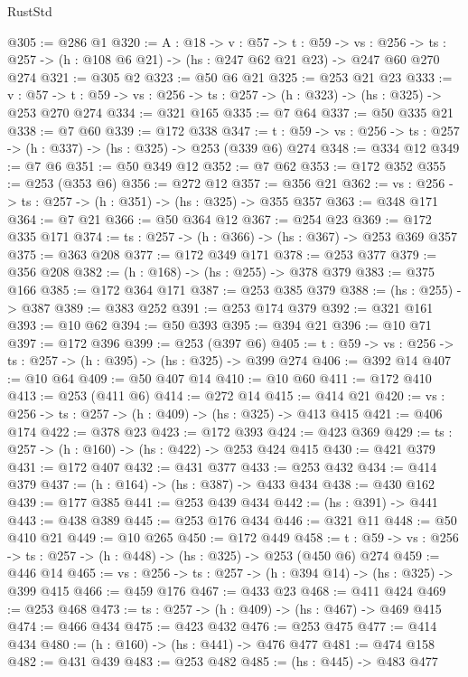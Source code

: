 \begin{lexlean}{RustStd}
\begin{coremodule}
@305 := @286 @1
@320 := {A : @18} ->
  {v : @57} ->
  {t : @59} ->
  {vs : @256} -> {ts : @257} -> (h : @108 @6 @21) -> (hs : @247 @62 @21 @23) -> @247 @60 @270 @274
@321 := @305 @2
@323 := @50 @6 @21
@325 := @253 @21 @23
@333 := {v : @57} ->
  {t : @59} -> {vs : @256} -> {ts : @257} -> (h : @323) -> (hs : @325) -> @253 @270 @274
@334 := @321 @165
@335 := @7 @64
@337 := @50 @335 @21
@338 := @7 @60
@339 := @172 @338
@347 := {t : @59} -> {vs : @256} -> {ts : @257} -> (h : @337) -> (hs : @325) -> @253 (@339 @6) @274
@348 := @334 @12
@349 := @7 @6
@351 := @50 @349 @12
@352 := @7 @62
@353 := @172 @352
@355 := @253 (@353 @6)
@356 := @272 @12
@357 := @356 @21
@362 := {vs : @256} -> {ts : @257} -> (h : @351) -> (hs : @325) -> @355 @357
@363 := @348 @171
@364 := @7 @21
@366 := @50 @364 @12
@367 := @254 @23
@369 := @172 @335 @171
@374 := {ts : @257} -> (h : @366) -> (hs : @367) -> @253 @369 @357
@375 := @363 @208
@377 := @172 @349 @171
@378 := @253 @377
@379 := @356 @208
@382 := (h : @168) -> (hs : @255) -> @378 @379
@383 := @375 @166
@385 := @172 @364 @171
@387 := @253 @385 @379
@388 := (hs : @255) -> @387
@389 := @383 @252
@391 := @253 @174 @379
@392 := @321 @161
@393 := @10 @62
@394 := @50 @393
@395 := @394 @21
@396 := @10 @71
@397 := @172 @396
@399 := @253 (@397 @6)
@405 := {t : @59} -> {vs : @256} -> {ts : @257} -> (h : @395) -> (hs : @325) -> @399 @274
@406 := @392 @14
@407 := @10 @64
@409 := @50 @407 @14
@410 := @10 @60
@411 := @172 @410
@413 := @253 (@411 @6)
@414 := @272 @14
@415 := @414 @21
@420 := {vs : @256} -> {ts : @257} -> (h : @409) -> (hs : @325) -> @413 @415
@421 := @406 @174
@422 := @378 @23
@423 := @172 @393
@424 := @423 @369
@429 := {ts : @257} -> (h : @160) -> (hs : @422) -> @253 @424 @415
@430 := @421 @379
@431 := @172 @407
@432 := @431 @377
@433 := @253 @432
@434 := @414 @379
@437 := (h : @164) -> (hs : @387) -> @433 @434
@438 := @430 @162
@439 := @177 @385
@441 := @253 @439 @434
@442 := (hs : @391) -> @441
@443 := @438 @389
@445 := @253 @176 @434
@446 := @321 @11
@448 := @50 @410 @21
@449 := @10 @265
@450 := @172 @449
@458 := {t : @59} -> {vs : @256} -> {ts : @257} -> (h : @448) -> (hs : @325) -> @253 (@450 @6) @274
@459 := @446 @14
@465 := {vs : @256} -> {ts : @257} -> (h : @394 @14) -> (hs : @325) -> @399 @415
@466 := @459 @176
@467 := @433 @23
@468 := @411 @424
@469 := @253 @468
@473 := {ts : @257} -> (h : @409) -> (hs : @467) -> @469 @415
@474 := @466 @434
@475 := @423 @432
@476 := @253 @475
@477 := @414 @434
@480 := (h : @160) -> (hs : @441) -> @476 @477
@481 := @474 @158
@482 := @431 @439
@483 := @253 @482
@485 := (hs : @445) -> @483 @477

\end{coremodule}
\end{lexlean}
